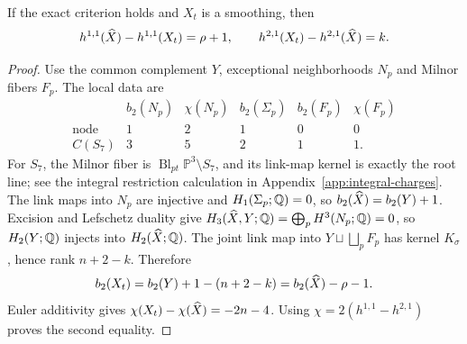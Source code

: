 \begin{proposition}\label{thm:forced-spectrum}
If the exact criterion holds and $X_t$ is a smoothing, then
\begin{equation}
 h^{1,1}(\widehat X)-h^{1,1}(X_t)=\rho+1,\qquad
 h^{2,1}(X_t)-h^{2,1}(\widehat X)=k.
 \label{eq:forced-spectrum-c1}
\end{equation}
\end{proposition}
\begin{proof}
Use the common complement $Y$, exceptional neighborhoods $N_p$
and Milnor fibers $F_p$. The local data are
\begin{equation}
\begin{array}{c|rrrrr}
 &b_2(N_p)&\chi(N_p)&b_2(\Sigma_p)&b_2(F_p)&\chi(F_p)\\\hline
 \text{node}&1&2&1&0&0\\
 C(S_7)&3&5&2&1&1.
\end{array}
\end{equation}
For $S_7$, the Milnor fiber is
$\operatorname{Bl}_{pt}\mathbb P^3\setminus S_7$, and its
link-map kernel is exactly the root line; see the integral
restriction calculation in Appendix~\ref{app:integral-charges}.
The link maps into $N_p$ are injective and $H_1(\Sigma_p;\mathbb Q)=0$,
so $b_2(\widehat X)=b_2(Y)+1$. Excision and Lefschetz duality give
$H_3(\widehat X,Y;\mathbb Q)=\bigoplus_pH^3(N_p;\mathbb Q)=0$, so
$H_2(Y;\mathbb Q)$ injects into $H_2(\widehat X;\mathbb Q)$. The joint link map into
$Y\sqcup\bigsqcup_pF_p$ has kernel $K_\sigma$, hence rank
$n+2-k$. Therefore
\begin{equation}
 b_2(X_t)=b_2(Y)+1-(n+2-k)
         =b_2(\widehat X)-\rho-1.
\end{equation}
Euler additivity gives $\chi(X_t)-\chi(\widehat X)=-2n-4$.
Using $\chi=2(h^{1,1}-h^{2,1})$ proves the second equality.
\end{proof}
